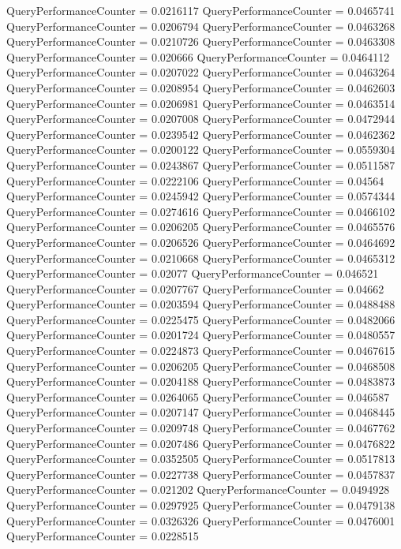 \documentclass[9pt]{article}
\theoremstyle{plain}
\theoremstyle{definition}
\theoremstyle{remark}
\numberwithin{equation}{section}
\begin{document}
QueryPerformanceCounter  =  0.0216117
QueryPerformanceCounter  =  0.0465741
QueryPerformanceCounter  =  0.0206794
QueryPerformanceCounter  =  0.0463268
QueryPerformanceCounter  =  0.0210726
QueryPerformanceCounter  =  0.0463308
QueryPerformanceCounter  =  0.020666
QueryPerformanceCounter  =  0.0464112
QueryPerformanceCounter  =  0.0207022
QueryPerformanceCounter  =  0.0463264
QueryPerformanceCounter  =  0.0208954
QueryPerformanceCounter  =  0.0462603
QueryPerformanceCounter  =  0.0206981
QueryPerformanceCounter  =  0.0463514
QueryPerformanceCounter  =  0.0207008
QueryPerformanceCounter  =  0.0472944
QueryPerformanceCounter  =  0.0239542
QueryPerformanceCounter  =  0.0462362
QueryPerformanceCounter  =  0.0200122
QueryPerformanceCounter  =  0.0559304
QueryPerformanceCounter  =  0.0243867
QueryPerformanceCounter  =  0.0511587
QueryPerformanceCounter  =  0.0222106
QueryPerformanceCounter  =  0.04564
QueryPerformanceCounter  =  0.0245942
QueryPerformanceCounter  =  0.0574344
QueryPerformanceCounter  =  0.0274616
QueryPerformanceCounter  =  0.0466102
QueryPerformanceCounter  =  0.0206205
QueryPerformanceCounter  =  0.0465576
QueryPerformanceCounter  =  0.0206526
QueryPerformanceCounter  =  0.0464692
QueryPerformanceCounter  =  0.0210668
QueryPerformanceCounter  =  0.0465312
QueryPerformanceCounter  =  0.02077
QueryPerformanceCounter  =  0.046521
QueryPerformanceCounter  =  0.0207767
QueryPerformanceCounter  =  0.04662
QueryPerformanceCounter  =  0.0203594
QueryPerformanceCounter  =  0.0488488
QueryPerformanceCounter  =  0.0225475
QueryPerformanceCounter  =  0.0482066
QueryPerformanceCounter  =  0.0201724
QueryPerformanceCounter  =  0.0480557
QueryPerformanceCounter  =  0.0224873
QueryPerformanceCounter  =  0.0467615
QueryPerformanceCounter  =  0.0206205
QueryPerformanceCounter  =  0.0468508
QueryPerformanceCounter  =  0.0204188
QueryPerformanceCounter  =  0.0483873
QueryPerformanceCounter  =  0.0264065
QueryPerformanceCounter  =  0.046587
QueryPerformanceCounter  =  0.0207147
QueryPerformanceCounter  =  0.0468445
QueryPerformanceCounter  =  0.0209748
QueryPerformanceCounter  =  0.0467762
QueryPerformanceCounter  =  0.0207486
QueryPerformanceCounter  =  0.0476822
QueryPerformanceCounter  =  0.0352505
QueryPerformanceCounter  =  0.0517813
QueryPerformanceCounter  =  0.0227738
QueryPerformanceCounter  =  0.0457837
QueryPerformanceCounter  =  0.021202
QueryPerformanceCounter  =  0.0494928
QueryPerformanceCounter  =  0.0297925
QueryPerformanceCounter  =  0.0479138
QueryPerformanceCounter  =  0.0326326
QueryPerformanceCounter  =  0.0476001
QueryPerformanceCounter  =  0.0228515
\end{document}
